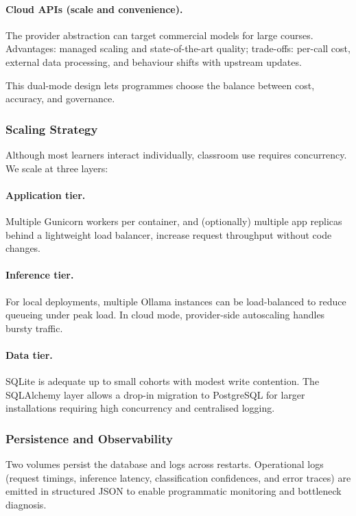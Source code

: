 \paragraph{Cloud APIs (scale and convenience).}
The provider abstraction can target commercial models for large courses. Advantages: managed scaling and state-of-the-art quality; trade-offs: per-call cost, external data processing, and behaviour shifts with upstream updates.

This dual-mode design lets programmes choose the balance between cost, accuracy, and governance.

\subsubsection{Scaling Strategy}
Although most learners interact individually, classroom use requires concurrency. We scale at three layers:

\paragraph{Application tier.}
Multiple Gunicorn workers per container, and (optionally) multiple app replicas behind a lightweight load balancer, increase request throughput without code changes.

\paragraph{Inference tier.}
For local deployments, multiple Ollama instances can be load-balanced to reduce queueing under peak load. In cloud mode, provider-side autoscaling handles bursty traffic.

\paragraph{Data tier.}
SQLite is adequate up to small cohorts with modest write contention. The SQLAlchemy layer allows a drop-in migration to PostgreSQL for larger installations requiring high concurrency and centralised logging.

\subsubsection{Persistence and Observability}
Two volumes persist the database and logs across restarts. Operational logs (request timings, inference latency, classification confidences, and error traces) are emitted in structured JSON to enable programmatic monitoring and bottleneck diagnosis.


